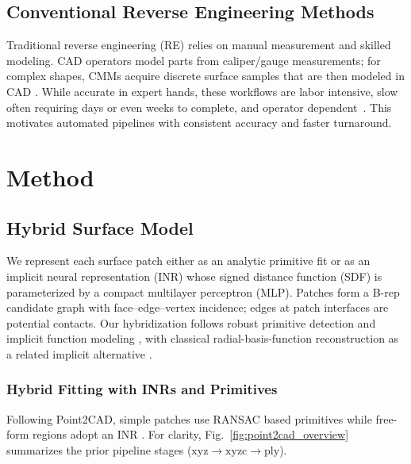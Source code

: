 \documentclass{ieeeaccess}
\begin{document}
\subsection{Conventional Reverse Engineering Methods}
Traditional reverse engineering (RE) relies on manual measurement and skilled modeling. CAD operators model parts from caliper/gauge measurements; for complex shapes, CMMs acquire discrete surface samples that are then modeled in CAD \cite{b16,b25}. While accurate in expert hands, these workflows are labor intensive, slow often requiring days or even weeks to complete, and operator dependent~\cite{b16}. This motivates automated pipelines with consistent accuracy and faster turnaround.



\section{Method}
\label{sec:method}

\subsection{Hybrid Surface Model}
We represent each surface patch either as an analytic primitive fit
or as an implicit neural representation (INR) whose signed distance function (SDF)
is parameterized by a compact multilayer perceptron (MLP). Patches form a B-rep candidate graph with face–edge–vertex incidence; edges at patch interfaces are potential contacts. Our hybridization follows robust primitive detection \cite{b15} and implicit function modeling \cite{b5,b6,b17,b21}, with classical radial-basis-function reconstruction as a related implicit alternative \cite{b13}.



\subsubsection{Hybrid Fitting with INRs and Primitives}
Following Point2CAD, simple patches use RANSAC based primitives while free-form regions adopt an INR \cite{b2,b15,b5,b17,b6,b21}. For clarity, Fig.~\ref{fig:point2cad_overview} summarizes the prior pipeline stages ($\text{xyz} \rightarrow \text{xyzc} \rightarrow \text{ply}$).
\end{document}
